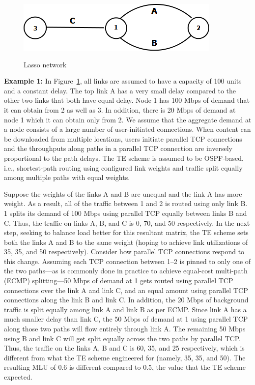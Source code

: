 \begin{figure}[tbh]
	\begin{center}
\label{fig:3node-bg}\includegraphics[scale=0.5]{final_images/Diagram3node.png}

	\caption{Lasso network}
	\end{center} 
	\end{figure}




\textbf{Example 1:} In Figure~\ref{fig:3node-bg}, all links are assumed to have a capacity of 100 units and a constant delay. The top link A has a very small delay compared to the other two links that both have equal delay. Node 1 has 100 Mbps of demand that it can obtain from 2 as well as 3. In addition, there is 20 Mbps of demand at node 1 which it can obtain only from 2.  We assume that the aggregate demand at a node consists of a large number of user-initiated connections. When content can be downloaded from multiple locations, users initiate parallel TCP connections and the throughputs along paths in a parallel TCP connection are inversely proportional to the path delays. The TE scheme is assumed to be OSPF-based, i.e., shortest-path routing using configured link weights and traffic split equally among multiple paths with equal weights.


Suppose the weights of the links A and B are unequal and the link A has more weight. As a result, all of the traffic between 1 and 2 is routed using only link B. 1 splits its demand of 100 Mbps using parallel TCP equally between links B and C. Thus, the traffic on links A, B, and C is  0, 70, and 50 respectively. In the next step, seeking to balance load better for this resultant matrix, the TE scheme sets both the links A and B to the same weight (hoping to achieve link utilizations of 35, 35, and 50 respectively).  Consider how parallel TCP connections respond to this change.
Assuming each TCP connection between 1--2 is pinned to only one of the two paths---as is commonly done in practice to achieve equal-cost multi-path (ECMP) splitting---50 Mbps of demand at 1 gets routed using parallel TCP connections over the link A and link C, and an equal amount using parallel TCP connections along the link B and link C. In addition, the 20 Mbps of background traffic is split equally among link A and link B as per ECMP.  Since link A has a much smaller delay than link C, the 50 Mbps of demand at 1 using parallel TCP along those two paths will flow entirely through link A. The remaining 50 Mbps using B and link C will get split equally across the two paths by parallel TCP. Thus, the traffic on the links A, B and C is 60, 35, and 25 respectively, which is different from what the TE scheme engineered for (namely, 35, 35, and 50). The resulting MLU of 0.6 is different compared to 0.5, the value that the TE scheme expected. 


